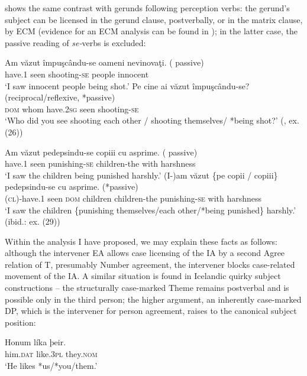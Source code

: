 \documentclass[output=paper]{langsci/langscibook}
\begin{document}
 shows the same contrast with gerunds following perception verbs: the gerund’s subject can be licensed in the gerund clause, postverbally, or in the matrix clause, by ECM (evidence for an ECM analysis can be found in \citealt{Avram2003}); in the latter case, the passive reading of \textit{se-}verbs is excluded:

\ea%
    \label{ex:giurgea:63}
    \ea
    \gll Am    văzut împuşcându-se oameni nevinovaţi. ( passive)  \\
          have.\textsc{1} seen   shooting-\textsc{se}      people  innocent\\
    \glt ‘I saw innocent people being shot.’
    \ex
    \gll Pe     cine      ai          văzut împuşcându-se? (reciprocal/reflexive, *passive)\\
         \textsc{dom} whom have.\textsc{2sg} seen  shooting-\textsc{se}\\
    \glt ‘Who did you see shooting each other / shooting themselves/ *being shot?’ (\citealt{Cornilescu1998}, ex. (26))
    \z
\z

\ea%
    \label{ex:giurgea:64}
\ea
    \gll Am     văzut pedepsindu-se copiii            cu     asprime. ( passive)  \\
         have.\textsc{1} seen   punishing-\textsc{se}    children-the with harshness\\
    \glt ‘I saw the children being punished harshly.’
\ex
    \gll (I-)am       văzut \{pe     copii   / copiii\}         pedepsindu-se cu     asprime.   (*passive)\\
          (\textsc{cl})-have.\textsc{1} seen \textsc{dom} children children-the punishing-\textsc{se}   with harshness\\
    \glt ‘I saw the children \{punishing themselves/each other/*being punished\} harshly.’ (ibid.: ex. (29))
    \z
\z    

Within the analysis I have proposed, we may explain these facts as follows: although the intervener EA allows case licensing of the IA by a second Agree relation of T, presumably Number agreement, the intervener blocks case-related movement of the IA. A similar situation is found in Icelandic quirky subject constructions – the structurally case-marked Theme remains postverbal and is possible only in the third\textsuperscript{} person; the higher argument, an inherently case-marked DP, which is the intervener for person agreement, raises to the canonical subject position:

\judgewidth{*}
\ea%
    \label{ex:giurgea:65}
    \ex
    \gll Honum   líka        þeir.\\
         him.\textsc{dat} like.\textsc{3pl} they.\textsc{nom}\\
    \glt ‘He likes *us/*you/them.’
    \z
\z    
\end{document}
